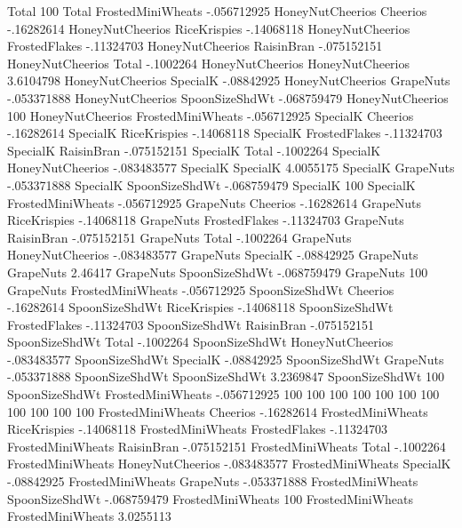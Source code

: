 Total	100%
Total	FrostedMiniWheats	-.056712925
HoneyNutCheerios	Cheerios	-.16282614
HoneyNutCheerios	RiceKrispies	-.14068118
HoneyNutCheerios	FrostedFlakes	-.11324703
HoneyNutCheerios	RaisinBran	-.075152151
HoneyNutCheerios	Total	-.1002264
HoneyNutCheerios	HoneyNutCheerios	3.6104798
HoneyNutCheerios	SpecialK	-.08842925
HoneyNutCheerios	GrapeNuts	-.053371888
HoneyNutCheerios	SpoonSizeShdWt	-.068759479
HoneyNutCheerios	100%
HoneyNutCheerios	FrostedMiniWheats	-.056712925
SpecialK	Cheerios	-.16282614
SpecialK	RiceKrispies	-.14068118
SpecialK	FrostedFlakes	-.11324703
SpecialK	RaisinBran	-.075152151
SpecialK	Total	-.1002264
SpecialK	HoneyNutCheerios	-.083483577
SpecialK	SpecialK	4.0055175
SpecialK	GrapeNuts	-.053371888
SpecialK	SpoonSizeShdWt	-.068759479
SpecialK	100%
SpecialK	FrostedMiniWheats	-.056712925
GrapeNuts	Cheerios	-.16282614
GrapeNuts	RiceKrispies	-.14068118
GrapeNuts	FrostedFlakes	-.11324703
GrapeNuts	RaisinBran	-.075152151
GrapeNuts	Total	-.1002264
GrapeNuts	HoneyNutCheerios	-.083483577
GrapeNuts	SpecialK	-.08842925
GrapeNuts	GrapeNuts	2.46417
GrapeNuts	SpoonSizeShdWt	-.068759479
GrapeNuts	100%
GrapeNuts	FrostedMiniWheats	-.056712925
SpoonSizeShdWt	Cheerios	-.16282614
SpoonSizeShdWt	RiceKrispies	-.14068118
SpoonSizeShdWt	FrostedFlakes	-.11324703
SpoonSizeShdWt	RaisinBran	-.075152151
SpoonSizeShdWt	Total	-.1002264
SpoonSizeShdWt	HoneyNutCheerios	-.083483577
SpoonSizeShdWt	SpecialK	-.08842925
SpoonSizeShdWt	GrapeNuts	-.053371888
SpoonSizeShdWt	SpoonSizeShdWt	3.2369847
SpoonSizeShdWt	100%
SpoonSizeShdWt	FrostedMiniWheats	-.056712925
100%
100%
100%
100%
100%
100%
100%
100%
100%
100%
100%
FrostedMiniWheats	Cheerios	-.16282614
FrostedMiniWheats	RiceKrispies	-.14068118
FrostedMiniWheats	FrostedFlakes	-.11324703
FrostedMiniWheats	RaisinBran	-.075152151
FrostedMiniWheats	Total	-.1002264
FrostedMiniWheats	HoneyNutCheerios	-.083483577
FrostedMiniWheats	SpecialK	-.08842925
FrostedMiniWheats	GrapeNuts	-.053371888
FrostedMiniWheats	SpoonSizeShdWt	-.068759479
FrostedMiniWheats	100%
FrostedMiniWheats	FrostedMiniWheats	3.0255113
